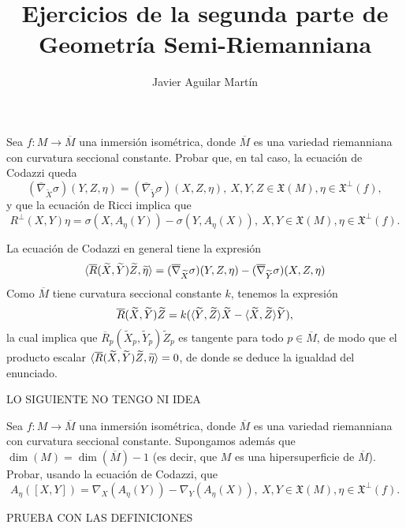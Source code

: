 \documentclass[twoside]{article}
\begin{document}
\title{Ejercicios de la segunda parte de Geometría Semi-Riemanniana}
\author{Javier Aguilar Martín}
\maketitle


\begin{ejercicio}{1}
 Sea $f : M → \overline{M}$ una inmersión isométrica, donde $\overline{M}$ es una variedad riemanniana
con curvatura seccional constante.
Probar que, en tal caso, la ecuación de Codazzi queda
\[
(\overline{∇}_{\widetilde{X}} σ)(Y, Z, η) = (\overline{∇}_{\widetilde{Y}} σ)(X, Z, η),\ X, Y, Z ∈ \mathfrak{X}(M), η ∈ \mathfrak{X}^⊥(f),
\]
y que la ecuación de Ricci implica que
\[
R^⊥(X, Y )η = σ(X, A_η(Y )) − σ(Y, A_η(X)),\ X, Y ∈ \mathfrak{X}(M), η ∈ \mathfrak{X}^⊥(f).
\]
\end{ejercicio}
\begin{solucion}
 La ecuación de Codazzi en general tiene la expresión 
 \[
\langle{\overline{R}(\widetilde{X},\widetilde{Y})\widetilde{Z},\widetilde{\eta}}\rangle=(\overline{\nabla}_{\widetilde{X}}\sigma)(Y,Z,\eta)-(\overline{\nabla}_{\widetilde{Y}}\sigma)(X,Z,\eta)
\]
Como $\overline{M}$ tiene curvatura seccional constante $k$, tenemos la expresión 
\[
\overline{R}(\widetilde{X}, \widetilde{Y} )\widetilde{Z} = k(\langle{\widetilde{Y},\widetilde{Z}}\rangle\widetilde{X} - \langle{\widetilde{X},\widetilde{Z}}\rangle\widetilde{Y} ),
\]
la cual implica que $\overline{R}_p(\widetilde{X}_p, \widetilde{Y}_p )\widetilde{Z}_p$ es tangente para todo $p\in\overline{M}$, de modo que el producto escalar $\langle{\overline{R}(\widetilde{X},\widetilde{Y})\widetilde{Z},\widetilde{\eta}}\rangle=0$, de donde se deduce la igualdad del enunciado. 

LO SIGUIENTE NO TENGO NI IDEA
\end{solucion}

\begin{ejercicio}{2}
Sea $f : M → \overline{M}$ una inmersión isométrica, donde $\overline{M}$ es una variedad riemanniana
con curvatura seccional constante. Supongamos además que $\dim(M) = \dim(\overline{M}) − 1$
(es decir, que $M$ es una hipersuperficie de $\overline{M}$).
Probar, usando la ecuación de Codazzi, que
\[
A_η([X, Y ]) = ∇_X(A_η(Y)) − ∇_Y (A_η(X)),\ X, Y ∈ \mathfrak{X}(M), η ∈ \mathfrak{X}^⊥(f).
\]
\end{ejercicio}
\begin{solucion}
PRUEBA CON LAS DEFINICIONES
\end{solucion}
\end{document}
